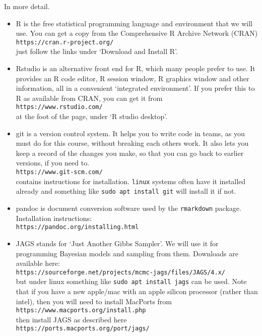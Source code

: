 \documentclass[10pt] {article}
\theoremstyle{definition}
\begin{document}
In more detail.
\begin{itemize}
\item R is the free statistical programming language and environment that we will use. You can get a copy from the Comprehensive R Archive Network (CRAN)\\
\verb+https://cran.r-project.org/+\\
just follow the links under `Download and Install R'. 
\item Rstudio is an alternative front end for R, which many people prefer to use. It provides an R code editor, R session window, R graphics window and other information, all in a convenient `integrated environment'. If you prefer this to R as available from CRAN, you can get it from\\
\verb+https://www.rstudio.com/+\\
at the foot of the page, under `R studio desktop'. 
\item git is a version control system. It helps you to write code in teams, as you must do for this course, without breaking each others work. It also lets you keep a record of the changes you make, so that you can go back to earlier versions, if you need to. \\
\verb+https://www.git-scm.com/+\\
contains instructions for installation. {\tt linux} systems often have it installed already and something like \verb+sudo apt install git+ will install it if not. 
\item pandoc is document conversion software used by the {\tt rmarkdown} package. Installation instructions:\\
\verb+https://pandoc.org/installing.html+ 
\item JAGS stands for `Just Another Gibbs Sampler'. We will use it for programming Bayesian models and sampling from them. Downloads are available here:\\
\verb+https://sourceforge.net/projects/mcmc-jags/files/JAGS/4.x/+\\
but under linux something like \verb+sudo apt install jags+ can be used. Note that if you have a new apple/mac with an apple silicon processor (rather than intel), then you will need to install MacPorts from\\ 
\verb+https://www.macports.org/install.php+\\
then install JAGS as described here\\
\verb+https://ports.macports.org/port/jags/+
\end{itemize}
\end{document}
